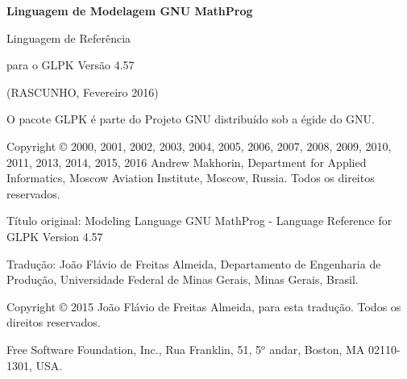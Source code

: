 \documentclass[11pt, brazil]{report}
\begin{document}
\thispagestyle{empty}

\begin{center}

\vspace*{1.5in}

\begin{huge}
\sf\bfseries Linguagem de Modelagem GNU MathProg
\end{huge}

\vspace{0.5in}

\begin{LARGE}
\sf Linguagem de Referência %
\end{LARGE}

\vspace{0.5in}

\begin{LARGE}	
\sf para o GLPK Versão 4.57
\end{LARGE}

\vspace{0.5in}
\begin{Large}
\sf (RASCUNHO, Fevereiro 2016)
\end{Large}

\end{center}

\newpage

\vspace*{1in}

\vfill

\noindent
O pacote GLPK é parte do Projeto GNU distribuído sob a égide do GNU.

\noindent
Copyright \copyright{} 2000, 2001, 2002, 2003, 2004, 2005, 2006, 2007,
2008, 2009, 2010, 2011, 2013, 2014, 2015, 2016 Andrew Makhorin, Department
for Applied Informatics, Moscow Aviation Institute, Moscow, Russia.
Todos os direitos reservados.

\noindent
Título original: Modeling Language GNU MathProg - Language Reference for GLPK Version 4.57

\noindent
Tradução: João Flávio de Freitas Almeida, Departamento de Engenharia de Produção, Universidade Federal de Minas Gerais,
Minas Gerais, Brasil.

\noindent
Copyright \copyright{} 2015 João Flávio de Freitas Almeida, para esta tradução. Todos os direitos reservados.

\noindent
Free Software Foundation, Inc., Rua Franklin, 51, 5$^{o}$ andar, Boston,
MA 02110-1301, USA.
\end{document}
